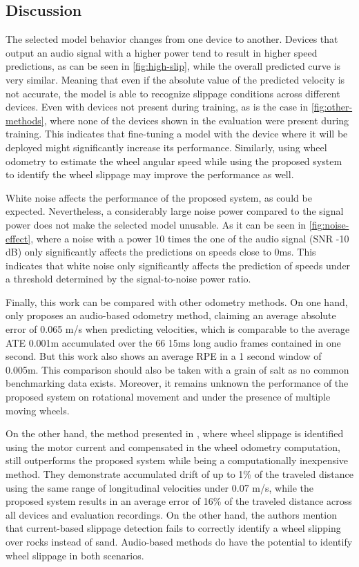 \subsection{Discussion} \label{subsec:discussion}

The selected model behavior changes from one device to another. Devices that
output an audio signal with a higher power tend to result in higher speed
predictions, as can be seen in \cref{fig:high-slip}, while the overall
predicted curve is very similar. Meaning that even if the absolute value of the
predicted velocity is not accurate, the model is able to recognize slippage
conditions across different devices. Even with devices not present during
training, as is the case in \cref{fig:other-methods}, where none of the devices
shown in the evaluation were present during training. This indicates that
fine-tuning \cite{TL2016} a model with the device where it will be deployed
might significantly increase its performance. Similarly, using wheel odometry
to estimate the wheel angular speed while using the proposed system to identify
the wheel slippage may improve the performance as well.

White noise affects the performance of the proposed system, as could
be expected. Nevertheless, a considerably large noise power compared to the
signal power does not make the selected model unusable. As it can be seen in
\cref{fig:noise-effect}, where a noise with a power 10 times the one of the
audio signal (SNR -10 dB) only significantly affects the predictions on
speeds close to 0ms. This indicates that white noise only significantly affects
the prediction of speeds under a threshold determined by the signal-to-noise
power ratio.

Finally, this work can be compared with other odometry methods. On one hand,
only \cite{marchegiani2018a} proposes an audio-based odometry method, claiming
an average absolute error of 0.065 m/s when predicting velocities, which is
comparable to the average ATE 0.001m accumulated over the 66 15ms long audio
frames contained in one second. But this work also shows an average RPE in a 1
second window of 0.005m. This comparison should also be taken with a grain of
salt as no common benchmarking data exists. Moreover, it remains unknown
the performance of the proposed system on rotational movement and under the
presence of multiple moving wheels.

On the other hand, the method presented in \cite{Ojeda2006}, where wheel
slippage is identified using the motor current and compensated in the wheel
odometry computation, still outperforms the proposed system while being a
computationally inexpensive method. They demonstrate accumulated drift of up to
1\% of the traveled distance using the same range of longitudinal velocities
under 0.07 m/s, while the proposed system results in an average error of
16\% of the traveled distance across all devices and evaluation recordings.
On the other hand, the authors mention that current-based slippage detection
fails to correctly identify a wheel slipping over rocks instead of sand.
Audio-based methods do have the potential to identify wheel slippage in both
scenarios.